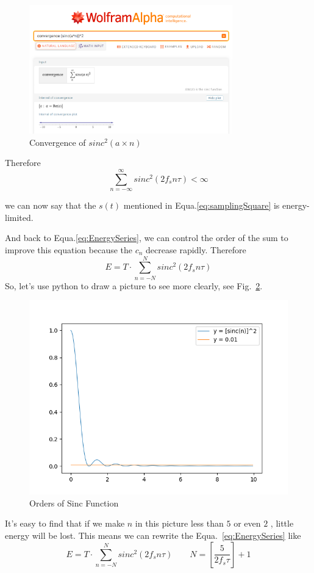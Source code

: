 \documentclass{article}
\begin{document}
\begin{figure}[htbp]
    \centering
    \includegraphics[keepaspectratio,width=250pt]{../pic/sinc_convergence.png}
    \caption{Convergence of $sinc^2(a\times n)$}
    \label{fig:sinc_convergence}
\end{figure}


Therefore
\begin{equation*}
\sum_{n = -\infty}^{\infty} sinc^2(2f_sn\tau) < \infty
\end{equation*}

we can now say that the $s(t)$ mentioned in Equa.\ref{eq:samplingSquare} is energy-limited.

And back to Equa.\ref{eq:EnergySeries}, we can control the order of the sum to improve this equation because the $c_n$ decrease rapidly. Therefore
$$
E = T \cdot \sum_{n = -N}^{N} sinc^2(2f_sn\tau)
$$
So, let's use python to draw a picture to see more clearly, see Fig.~\ref{fig:sincAndLine}.

\begin{figure}[!h]
    \centering
    \includegraphics[width=3 in]{../pic/sincAndLine.png}
    \caption{Orders of Sinc Function}
    \label{fig:sincAndLine}
\end{figure}
It's easy to find that if we make $n$ in this picture less than $5$ or even $2$ , little energy will be lost. This means we can rewrite the Equa.~\ref{eq:EnergySeries} like
\begin{equation}
E = T \cdot \sum_{n = -N}^{N} sinc^2(2f_sn\tau) \qquad N = [\frac{5}{2f_s \tau}] + 1
\label{eq:improvedEnergy}
\end{equation}
\end{document}
